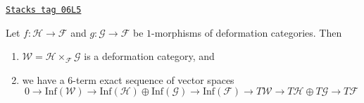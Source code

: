 \begin{lemma}
\label{formal-defos-lemma-deformation-categories-fiber-product-morphisms}
\href{https://stacks.math.columbia.edu/tag/06L5}{\texttt{Stacks tag 06L5}}

Let $f : \mathcal{H} \to \mathcal{F}$ and $g : \mathcal{G} \to \mathcal{F}$
be $1$-morphisms of deformation categories. Then
\begin{enumerate}
\item $\mathcal{W} = \mathcal{H} \times_\mathcal{F} \mathcal{G}$ is a
deformation category, and
\item we have a $6$-term exact sequence of vector spaces
$$
0 \to \text{Inf}(\mathcal{W})
\to \text{Inf}(\mathcal{H}) \oplus \text{Inf}(\mathcal{G})
\to \text{Inf}(\mathcal{F}) \to
T\mathcal{W} \to T\mathcal{H} \oplus T\mathcal{G} \to T\mathcal{F}
$$
\end{enumerate}
\end{lemma}

